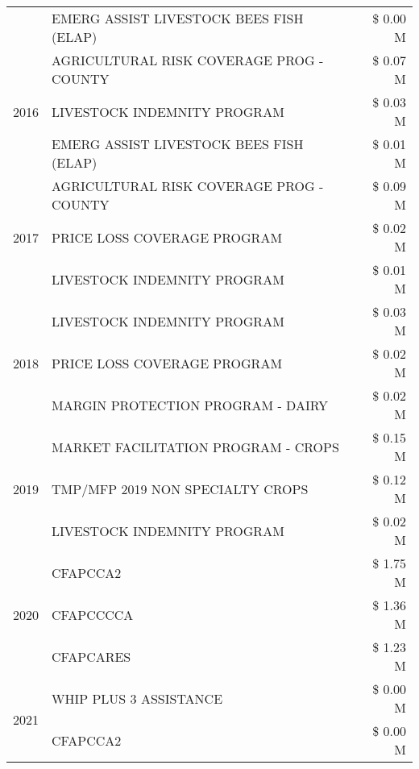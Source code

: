 \begin{tabular}{llr}
 & EMERG ASSIST LIVESTOCK BEES FISH (ELAP) & \$ 0.00 M \\
\cline{1-3}
\multirow[t]{3}{*}{2016} & AGRICULTURAL RISK COVERAGE PROG - COUNTY & \$ 0.07 M \\
 & LIVESTOCK INDEMNITY PROGRAM & \$ 0.03 M \\
 & EMERG ASSIST LIVESTOCK BEES FISH (ELAP) & \$ 0.01 M \\
\cline{1-3}
\multirow[t]{3}{*}{2017} & AGRICULTURAL RISK COVERAGE PROG - COUNTY & \$ 0.09 M \\
 & PRICE LOSS COVERAGE PROGRAM & \$ 0.02 M \\
 & LIVESTOCK INDEMNITY PROGRAM & \$ 0.01 M \\
\cline{1-3}
\multirow[t]{3}{*}{2018} & LIVESTOCK INDEMNITY PROGRAM & \$ 0.03 M \\
 & PRICE LOSS COVERAGE PROGRAM & \$ 0.02 M \\
 & MARGIN PROTECTION PROGRAM - DAIRY & \$ 0.02 M \\
\cline{1-3}
\multirow[t]{3}{*}{2019} & MARKET FACILITATION PROGRAM - CROPS & \$ 0.15 M \\
 & TMP/MFP 2019 NON SPECIALTY CROPS & \$ 0.12 M \\
 & LIVESTOCK INDEMNITY PROGRAM & \$ 0.02 M \\
\cline{1-3}
\multirow[t]{3}{*}{2020} & CFAPCCA2 & \$ 1.75 M \\
 & CFAPCCCCA & \$ 1.36 M \\
 & CFAPCARES & \$ 1.23 M \\
\cline{1-3}
\multirow[t]{2}{*}{2021} & WHIP PLUS 3 ASSISTANCE & \$ 0.00 M \\
 & CFAPCCA2 & \$ 0.00 M \\
\cline{1-3}
\bottomrule
\end{tabular}
